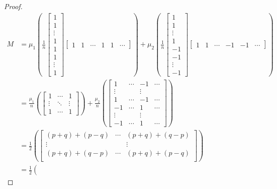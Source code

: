 \documentclass[11pt]{article}
\begin{document}
\begin{enumerate}
\begin{proof}
\begin{align*}
	M &= \mu_1 \left( \frac{1}{n}
	\begin{bmatrix}
	1 \\
	1 \\
	\vdots \\
	1 \\
	1 \\
	1 \\
	\vdots \\
	1
	\end{bmatrix}
	\begin{bmatrix}
		1 & 1 & \cdots & 1 & 1 & \cdots
	\end{bmatrix}\right)
	+ \mu_2 \left( \frac{1}{n}
	\begin{bmatrix}
	1 \\
	1 \\
	\vdots \\
	1 \\
	-1 \\
	-1 \\
	\vdots \\
	-1
	\end{bmatrix}
	\begin{bmatrix}
		1 & 1 & \cdots & -1 & -1 & \cdots
	\end{bmatrix} \right) \\
	& = \frac{\mu_1}{n} \left(
	\begin{bmatrix}
	1 & \cdots & 1 \\
	\vdots & \ddots & \vdots \\
	1 & \cdots & 1
	\end{bmatrix} \right)
	+ \frac{\mu_2}{n} \left(
	\begin{bmatrix}
	1 & \cdots & -1 & \cdots \\
	\vdots &  & \vdots \\
	1 & \cdots & -1 & \cdots \\
	-1 & \cdots & 1 & \cdots \\
	\vdots &  & \vdots & \\
	-1 & \cdots & 1 & \cdots
	\end{bmatrix} \right) \\
	&= \frac{1}{2} \left(
	\begin{bmatrix}
	(p + q) + (p - q) & \cdots & (p + q) + (q - p) \\
	\vdots & & \vdots \\
	(p + q) + (q - p) & \cdots & (p + q) + (p - q) \\
	\end{bmatrix}\right) \\
	&= \frac{1}{2} \left(

\end{align*}
\end{proof}
\end{enumerate}
\end{document}
